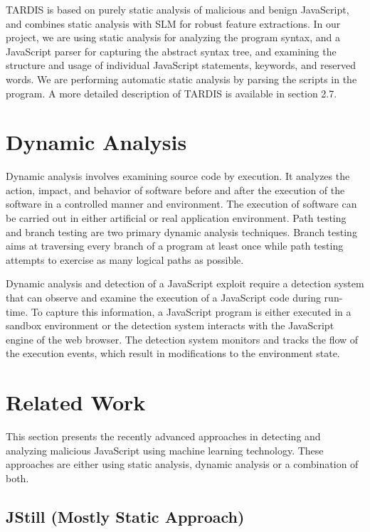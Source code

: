 TARDIS is based on purely static analysis of malicious and benign JavaScript, and combines static analysis with SLM for robust feature extractions. In our project, we are using static analysis for analyzing the program syntax, and a JavaScript parser for capturing the abstract syntax tree, and examining the structure and usage of individual JavaScript statements, keywords, and reserved words. We are performing automatic static analysis by parsing the scripts in the program. A more detailed description of TARDIS is available in section 2.7. 

\section{Dynamic Analysis} \label{dynamic_analysis}

Dynamic analysis involves examining source code by execution. It analyzes the action, impact, and behavior of software before and after the execution of the software in a controlled manner and environment. The execution of software can be carried out in either artificial or real application environment. Path testing and branch testing are two primary dynamic analysis techniques. Branch testing aims at traversing every branch of a program at least once while path testing attempts to exercise as many logical paths as possible.

Dynamic analysis and detection of a JavaScript exploit require a detection system that can observe and examine the execution of a JavaScript code during run-time. To capture this information, a JavaScript program is either executed in a sandbox environment or the detection system interacts with the JavaScript engine of the web browser. The detection system monitors and tracks the flow of the execution events, which result in modifications to the environment state.

\section{Related Work} \label{related_work}

This section presents the recently advanced approaches in detecting and analyzing malicious JavaScript using machine learning technology. These approaches are either using static analysis, dynamic analysis or a combination of both.

\subsection{JStill (Mostly Static Approach) ~\cite{g6}} \label{jstill}


